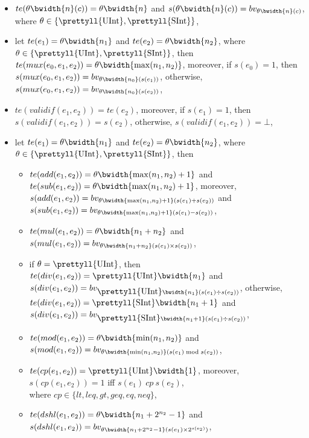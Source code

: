 \begin{itemize}
\item $te(\theta \bwidth{n}(c)) = \theta \bwidth{n}$ and $s(\theta \bwidth{n}(c)) = bv_{\theta \bwidth{n}(c)}$, where $\theta \in \{\mbox{\prettyll{UInt}}, \mbox{\prettyll{SInt}}\}$,
%
\item let $te(e_1) = \theta \bwidth{n_1}$ and $te(e_2) = \theta \bwidth{n_2}$, where $\theta \in \{\mbox{\prettyll{UInt}}, \mbox{\prettyll{SInt}}\}$, then $te(mux(e_0, e_1, e_2)) = \theta\bwidth{\max(n_1, n_2)}$, moreover, if $s(e_0) = 1$, then $s(mux(e_0, e_1, e_2)) = bv_{\theta\bwidth{n_0}(s(e_1))}$, otherwise, $s(mux(e_0, e_1, e_2)) = bv_{\theta\bwidth{n_0}(s(e_2))}$,
%
\item $te(validif(e_1, e_2)) = te(e_2)$, moreover, if $s(e_1) = 1$, then $s(validif(e_1, e_2)) = s(e_2)$, otherwise, $s(validif(e_1, e_2))  = \bot$,
%
\item let $te(e_1) = \theta \bwidth{n_1}$ and $te(e_2) = \theta \bwidth{n_2}$, where $\theta \in \{\mbox{\prettyll{UInt}}, \mbox{\prettyll{SInt}}\}$, then
\begin{itemize}
\item $te(add(e_1, e_2)) =\theta \bwidth{\max(n_1, n_2)+1}$ and $te(sub(e_1, e_2)) = \theta \bwidth{\max(n_1, n_2)+1}$, moreover, $s(add(e_1, e_2)) = bv_{\theta \bwidth{\max(n_1,n_2)+1} (s(e_1) + s(e_2))}$ and \\
$s(sub(e_1, e_2)) = bv_{\theta \bwidth{\max(n_1,n_2)+1} (s(e_1) - s(e_2))}$,
%
\item $te(mul(e_1, e_2)) = \theta \bwidth{n_1+n_2}$ and $s(mul(e_1, e_2)) = bv_{\theta \bwidth{n_1+n_2} (s(e_1) \times s(e_2))}$,
%
\item  if $\theta = \mbox{\prettyll{UInt}}$, then $te(div(e_1, e_2)) =\mbox{\prettyll{UInt}} \bwidth{n_1}$ and $s(div(e_1, e_2)) = bv_{\mbox{\prettyll{UInt}} \bwidth{n_1} (s(e_1) \div s(e_2))}$, otherwise, $te(div(e_1, e_2)) = \mbox{\prettyll{SInt}} \bwidth{n_1+1}$ and $s(div(e_1, e_2)) = bv_{\mbox{\prettyll{SInt}} \bwidth{n_1+1} (s(e_1) \div s(e_2))}$,
%
\item $te(mod(e_1, e_2)) = \theta \bwidth{\min(n_1,n_2)}$ and $s(mod(e_1, e_2)) = bv_{\theta \bwidth{\min(n_1,n_2)} (s(e_1) \bmod s(e_2))}$,
%
\item $te(cp(e_1, e_2)) = \mbox{\prettyll{UInt}} \bwidth{1}$, moreover, $s(cp(e_1, e_2)) = 1$ iff $s(e_1)\ cp\ s(e_2)$, \\ where $cp \in \{lt, leq, gt, geq, eq, neq\}$,
%
\item $te(dshl(e_1, e_2)) = \theta \bwidth{n_1+2^{n_2}-1}$ and $s(dshl(e_1, e_2)) = bv_{\theta \bwidth{n_1+2^{n_2}-1}(s(e_1) \times 2^{s(e_2)})}$,

\end{itemize}
\end{itemize}
